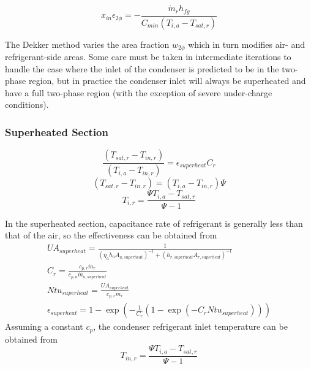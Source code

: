 \documentclass[]{article}
\begin{document}
\begin{equation}
x_{in}\epsilon_{2\phi}=-\frac{\dot m_r h_{fg}}{C_{min}(T_{i,a}-T_{sat,r})}
\end{equation}

The Dekker method varies the area fraction $w_{2\phi}$ which in turn modifies air- and refrigerant-side areas.  Some care must be taken in intermediate iterations to handle the case where the inlet of the condenser is predicted to be in the two-phase region, but in practice the condenser inlet will always be superheated and have a full two-phase region (with the exception of severe under-charge conditions).
	
\subsubsection{Superheated Section}

\begin{equation}
\frac{(T_{sat,r}-T_{in,r})}{(T_{i,a}-T_{in,r})}=\epsilon_{superheat}C_r
\end{equation}
\begin{equation}
 (T_{sat,r}-T_{in,r}) =(T_{i,a}-T_{in,r})\Psi
\end{equation}
\begin{equation}
T_{i,r}=\frac{\Psi T_{i,a}-T_{sat,r}}{\Psi-1}
\end{equation}

In the superheated section, capacitance rate of refrigerant is generally less than that of the air, so the effectiveness can be obtained from
\begin{equation}
\begin{array}{l}
UA_{superheat} = \displaystyle\frac{1}{  (\eta_a h_a A_{a,superheat})^{-1} + (h_{r,superheat} A_{r,superheat})^{-1}}\\[0.6em]
C_r = \displaystyle\frac{c_{p,r}  \dot m_r}{ c_{p,a}  \dot m_{a,superheat}}\\[0.6em]
Ntu_{superheat} = \displaystyle\frac{UA_{superheat}}{c_{p,r}  \dot m_r}\\[0.6em]
\epsilon_{superheat} = 1 - \exp(-\displaystyle\frac{1}{C_r}  (1 - \exp(-C_r Ntu_{superheat})))
\end{array}
\end{equation}
Assuming a constant $c_p$, the condenser refrigerant inlet temperature can be obtained from
\begin{equation}
T_{in,r}=\frac{\Psi T_{i,a}-T_{sat,r}}{\Psi-1}
\end{equation}
\end{document}
